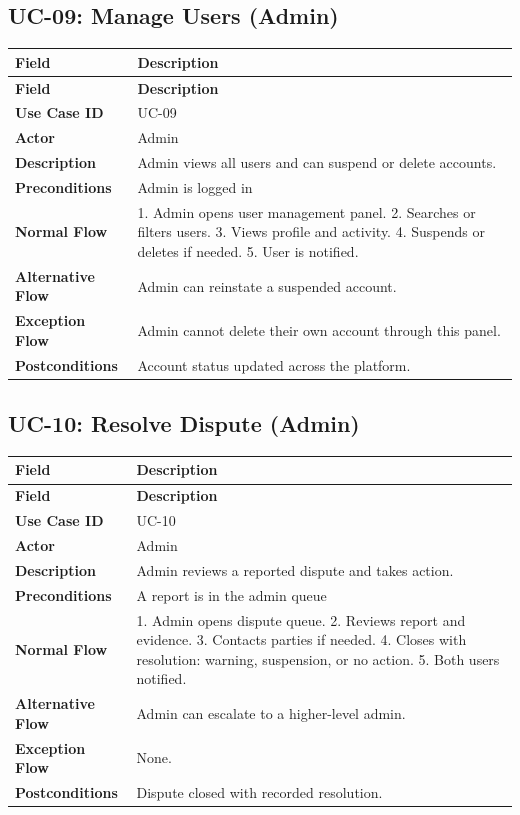 \documentclass[12pt,a4paper]{article}
\begin{document}
\subsection*{UC-09: Manage Users (Admin)}
\begin{longtable}{>{\bfseries}L{3.5cm} L{10cm}}
\toprule
\textbf{Field} & \textbf{Description} \\ \midrule \endfirsthead \midrule \textbf{Field} & \textbf{Description} \\ \midrule \endhead \bottomrule \endfoot
Use Case ID      & UC-09 \\
Actor            & Admin \\
Description      & Admin views all users and can suspend or delete accounts. \\
Preconditions    & Admin is logged in \\
Normal Flow      & 1. Admin opens user management panel. 2. Searches or filters users. 3. Views profile and activity. 4. Suspends or deletes if needed. 5. User is notified. \\
Alternative Flow & Admin can reinstate a suspended account. \\
Exception Flow   & Admin cannot delete their own account through this panel. \\
Postconditions   & Account status updated across the platform. \\
\end{longtable}

\subsection*{UC-10: Resolve Dispute (Admin)}
\begin{longtable}{>{\bfseries}L{3.5cm} L{10cm}}
\toprule
\textbf{Field} & \textbf{Description} \\ \midrule \endfirsthead \midrule \textbf{Field} & \textbf{Description} \\ \midrule \endhead \bottomrule \endfoot
Use Case ID      & UC-10 \\
Actor            & Admin \\
Description      & Admin reviews a reported dispute and takes action. \\
Preconditions    & A report is in the admin queue \\
Normal Flow      & 1. Admin opens dispute queue. 2. Reviews report and evidence. 3. Contacts parties if needed. 4. Closes with resolution: warning, suspension, or no action. 5. Both users notified. \\
Alternative Flow & Admin can escalate to a higher-level admin. \\
Exception Flow   & None. \\
Postconditions   & Dispute closed with recorded resolution. \\
\end{longtable}
\end{document}
